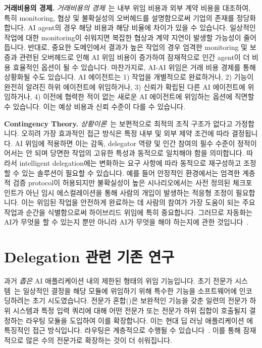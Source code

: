 \documentclass[11pt, a4paper, twocolumn, copyright, goog]{google}
\begin{document}
\textbf{거래비용의 경제.} \emph{거래비용의 경제}~\citep{williamson1979transaction, williamson1989transaction, tadelis2012transaction, cuypers2021transaction}는 내부 위임 비용과 외부 계약 비용을 대조하여, 특히 monitoring, 협상 및 불확실성의 오버헤드를 설명함으로써 기업의 존재를 정당화합니다. AI agent의 경우 해당 비용과 해당 비율에 차이가 있을 수 있습니다. 일상적인 작업에 대한 monitoring이 쉬워지면 복잡한 협상과 계약 지연이 발생할 가능성이 줄어듭니다. 반대로, 중요한 도메인에서 결과가 높은 작업의 경우 엄격한 monitoring 및 보증과 관련된 오버헤드로 인해 AI 위임 비용이 증가하여 잠재적으로 인간 agent이 더 비용 효율적인 옵션이 될 수 있습니다. 마찬가지로, AI-AI 위임은 거래 비용 경제를 통해 상황화될 수도 있습니다. AI 에이전트는 1) 작업을 개별적으로 완료하거나, 2) 기능이 완전히 알려진 하위 에이전트에 위임하거나, 3) 신뢰가 확립된 다른 AI 에이전트에 위임하거나, 4) 이전에 협력한 적이 없는 새로운 AI 에이전트에 위임하는 옵션에 직면할 수 있습니다. 이는 예상 비용과 신뢰 수준이 다를 수 있습니다.

\textbf{Contingency Theory.} \emph{상황이론}~\citep{luthans1977general, van1984concept,  donaldson2001contingency, otley2016contingency}는 보편적으로 최적의 조직 구조가 없다고 가정합니다. 오히려 가장 효과적인 접근 방식은 특정 내부 및 외부 제약 조건에 따라 결정됩니다. AI 위임에 적용하면 이는 감독, delegator 역량 및 인간 참여의 필수 수준이 정적이어서는 안 되며 당면한 작업의 고유한 특성과 동적으로 일치해야 함을 의미합니다. 따라서 intelligent delegation에는 변화하는 요구 사항에 따라 동적으로 재구성하고 조정할 수 있는 솔루션이 필요할 수 있습니다. 예를 들어 안정적인 환경에서는 엄격한 계층적 검증 protocol이 허용되지만 불확실성이 높은 시나리오에서는 사전 정의된 체크포인트가 아닌 임시 에스컬레이션을 통해 사람의 개입이 발생하는 적응형 조정이 필요합니다. 이는 위임된 작업을 안전하게 완료하는 데 사람의 참여가 가장 도움이 되는 주요 작업과 순간을 식별함으로써 하이브리드 \citep{fuchs2024optimizing} 위임에 특히 중요합니다. 그러므로 자동화는 AI가 무엇을 할 수 있는지 뿐만 아니라 AI가 무엇을 해야 하는지에 관한 것입니다~\citep{lubars2019ask}.

\section{Delegation 관련 기존 연구}

과거 \emph{좁은} AI 애플리케이션 내의 제한된 형태의 위임 기능입니다. 초기 전문가 시스템~\citep{buchanan1988fundamentals, jacobs1991adaptive}는 일상적인 결정을 해당 모듈에 위임하기 위해 특수한 기능을 소프트웨어에 인코딩하려는 초기 시도였습니다. 전문가 혼합(\citep{yuksel2012twenty, masoudnia2014mixture})은 보완적인 기능을 갖춘 일련의 전문가 하위 시스템과 특정 입력 쿼리에 대해 어떤 전문가 또는 전문가 하위 집합이 호출될지 결정하는 라우팅 모듈을 도입하여 이를 확장합니다. 이는 현대 딥 러닝 애플리케이션 \citep{shazeer2017outrageously, riquelme2021scaling, chen2022towards, zhou2022mixture, jiang2024mixtral, he2024mixture, cai2025survey}에 특징적인 접근 방식입니다. 라우팅은 계층적으로 수행될 수 있습니다~\citep{zhao2021hierarchical}. 이를 통해 잠재적으로 많은 수의 전문가로 확장하는 것이 더 쉬워집니다.
\end{document}
